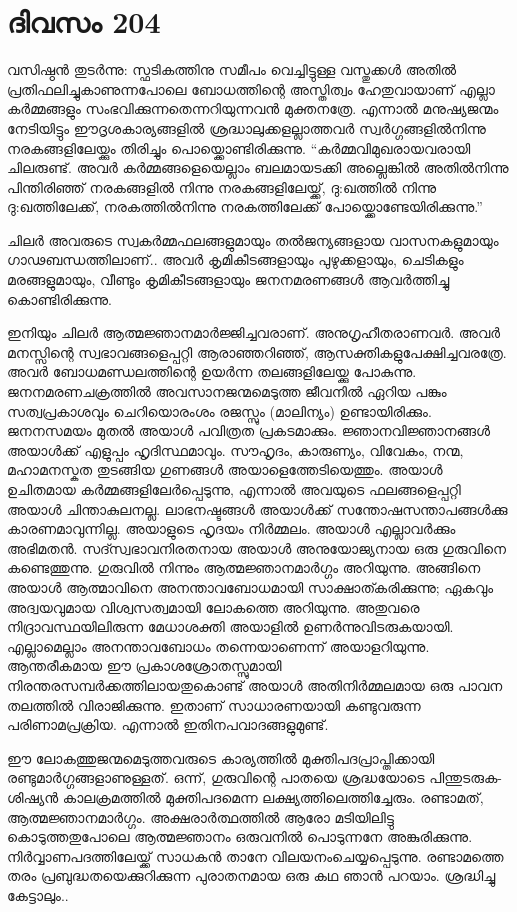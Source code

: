 \section{ദിവസം 204}


വസിഷ്ഠൻ തുടർന്നു: സ്ഫടികത്തിനു സമീപം വെച്ചിട്ടുള്ള വസ്തുക്കൾ അതിൽ പ്രതിഫലിച്ചുകാണുന്നപോലെ ബോധത്തിന്റെ അസ്തിത്വം ഹേതുവായാണ്‌ എല്ലാ കർമ്മങ്ങളും സംഭവിക്കുന്നതെന്നറിയുന്നവൻ മുക്തനത്രേ. എന്നാൽ മനുഷ്യജന്മം നേടിയിട്ടും ഈദൃശകാര്യങ്ങളിൽ ശ്രദ്ധാലുക്കളല്ലാത്തവർ സ്വർഗ്ഗങ്ങളിൽനിന്നു നരകങ്ങളിലേയ്ക്കും തിരിച്ചും പൊയ്ക്കൊണ്ടിരിക്കുന്നു. “കർമ്മവിമുഖരായവരായി ചിലരുണ്ട്. അവർ കർമ്മങ്ങളെയെല്ലാം ബലമായടക്കി അല്ലെങ്കിൽ അതിൽനിന്നു പിന്തിരിഞ്ഞ് നരകങ്ങളിൽ നിന്നു നരകങ്ങളിലേയ്ക്ക്, ദു:ഖത്തിൽ നിന്നു ദു:ഖത്തിലേക്ക്, നരകത്തിൽനിന്നു നരകത്തിലേക്ക് പോയ്ക്കൊണ്ടേയിരിക്കുന്നു.”

ചിലർ അവരുടെ സ്വകർമ്മഫലങ്ങളുമായും തൽജന്യങ്ങളായ വാസനകളുമായും ഗാഢബന്ധത്തിലാണ്‌..  അവർ കൃമികീടങ്ങളായും പുഴുക്കളായും, ചെടികളും മരങ്ങളുമായും, വീണ്ടും കൃമികീടങ്ങളായും ജനനമരണങ്ങള്‍ ആവര്‍ത്തിച്ചു കൊണ്ടിരിക്കുന്നു.

ഇനിയും ചിലർ ആത്മജ്ഞാനമാർജ്ജിച്ചവരാണ്. അനുഗൃഹീതരാണവർ. അവർ മനസ്സിന്റെ സ്വഭാവങ്ങളെപ്പറ്റി ആരാഞ്ഞറിഞ്ഞ്, ആസക്തികളുപേക്ഷിച്ചവരത്രേ. അവർ ബോധമണ്ഡലത്തിന്റെ ഉയർന്ന തലങ്ങളിലേയ്ക്കു പോകുന്നു. ജനനമരണചക്രത്തിൽ അവസാനജന്മമെടുത്ത ജീവനിൽ ഏറിയ പങ്കും സത്വപ്രകാശവും ചെറിയൊരംശം രജസ്സും (മാലിന്യം) ഉണ്ടായിരിക്കും. ജനനസമയം മുതൽ അയാൾ പവിത്രത പ്രകടമാക്കും. ജ്ഞാനവിജ്ഞാനങ്ങൾ അയാൾക്ക് എളുപ്പം ഹൃദിസ്ഥമാവും. സൗഹൃദം, കാരുണ്യം, വിവേകം, നന്മ, മഹാമനസ്കത തുടങ്ങിയ ഗുണങ്ങൾ അയാളെത്തേടിയെത്തും. അയാൾ ഉചിതമായ  കർമ്മങ്ങളിലേർപ്പെടുന്നു, എന്നാൽ അവയുടെ ഫലങ്ങളെപ്പറ്റി അയാള്‍ ചിന്താകുലനല്ല. ലാഭനഷ്ടങ്ങൾ അയാൾക്ക് സന്തോഷസന്താപങ്ങൾക്കു കാരണമാവുന്നില്ല. അയാളുടെ ഹൃദയം നിർമ്മലം. അയാൾ എല്ലാവർക്കും അഭിമതൻ. സദ്സ്വഭാവനിരതനായ അയാൾ അനുയോജ്യനായ ഒരു ഗുരുവിനെ കണ്ടെത്തുന്നു. ഗുരുവിൽ നിന്നും ആത്മജ്ഞാനമാർഗ്ഗം അറിയുന്നു. അങ്ങിനെ അയാൾ ആത്മാവിനെ അനന്താവബോധമായി സാക്ഷാത്കരിക്കുന്നു; ഏകവും അദ്വയവുമായ വിശ്വസത്വമായി ലോകത്തെ അറിയുന്നു. അതുവരെ നിദ്രാവസ്ഥയിലിരുന്ന മേധാശക്തി അയാളിൽ ഉണർന്നുവിടരുകയായി. എല്ലാമെല്ലാം അനന്താവബോധം തന്നെയാണെന്ന് അയാളറിയുന്നു. ആന്തരീകമായ ഈ പ്രകാശശ്രോതസ്സുമായി നിരന്തരസമ്പർക്കത്തിലായതുകൊണ്ട് അയാൾ അതിനിർമ്മലമായ ഒരു പാവന തലത്തിൽ വിരാജിക്കുന്നു. ഇതാണ്‌ സാധാരണയായി കണ്ടുവരുന്ന പരിണാമപ്രക്രിയ. എന്നാൽ ഇതിനപവാദങ്ങളുമുണ്ട്.

ഈ ലോകത്തുജന്മമെടുത്തവരുടെ കാര്യത്തിൽ മുക്തിപദപ്രാപ്തിക്കായി രണ്ടുമാർഗ്ഗങ്ങളാണുള്ളത്.  ഒന്ന്, ഗുരുവിന്റെ പാതയെ ശ്രദ്ധയോടെ പിന്തുടരുക- ശിഷ്യൻ കാലക്രമത്തിൽ മുക്തിപദമെന്ന ലക്ഷ്യത്തിലെത്തിച്ചേരും. രണ്ടാമത്, ആത്മജ്ഞാനമാർഗ്ഗം. അക്ഷരാർത്ഥത്തിൽ ആരോ മടിയിലിട്ടു കൊടുത്തതുപോലെ ആത്മജ്ഞാനം ഒരുവനിൽ പൊടുന്നനേ അങ്കുരിക്കുന്നു. നിർവ്വാണപദത്തിലേയ്ക്ക് സാധകൻ താനേ വിലയനംചെയ്യപ്പെടുന്നു. രണ്ടാമത്തെ തരം പ്രബുദ്ധതയെക്കുറിക്കുന്ന പുരാതനമായ ഒരു കഥ ഞാൻ പറയാം. ശ്രദ്ധിച്ചു കേട്ടാലും.. 

